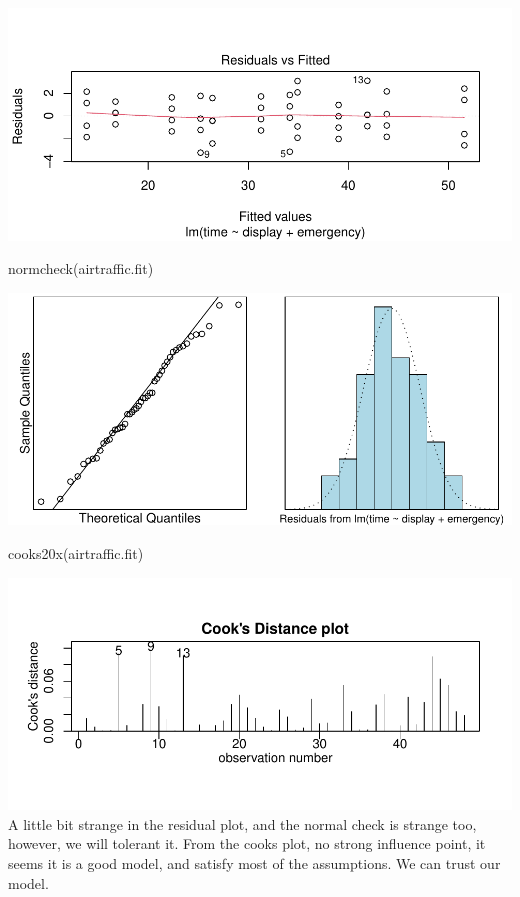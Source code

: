 \documentclass[
]{article}
\newenvironment{Shaded}{\begin{snugshade}}{\end{snugshade}}
\newcommand{\FunctionTok}[1]{\textcolor[rgb]{0.00,0.00,0.00}{#1}}
\newcommand{\NormalTok}[1]{#1}
\begin{document}
\includegraphics{STATS201_2022_SWU_A3_files/figure-latex/unnamed-chunk-10-1.pdf}

\begin{Shaded}
\begin{Highlighting}[]
\FunctionTok{normcheck}\NormalTok{(airtraffic.fit)}
\end{Highlighting}
\end{Shaded}

\includegraphics{STATS201_2022_SWU_A3_files/figure-latex/unnamed-chunk-10-2.pdf}

\begin{Shaded}
\begin{Highlighting}[]
\FunctionTok{cooks20x}\NormalTok{(airtraffic.fit)}
\end{Highlighting}
\end{Shaded}

\includegraphics{STATS201_2022_SWU_A3_files/figure-latex/unnamed-chunk-10-3.pdf}
A little bit strange in the residual plot, and the normal check is
strange too, however, we will tolerant it. From the cooks plot, no
strong influence point, it seems it is a good model, and satisfy most of
the assumptions. We can trust our model.
\end{document}
